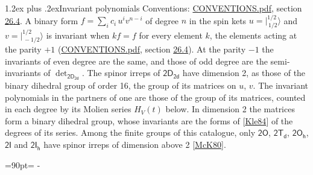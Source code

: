 \documentclass[10pt,a4paper]{article}
\makeatletter
\renewcommand\section{\@startsection{section}{1}{\z@}{-3ex plus -1ex minus -.2ex}%
  {1.2ex plus .2ex}{\normalfont\large\sffamily\bfseries\color{parttitle}}}
\newcommand{\needspace}[1]{\par\penalty-100\begingroup\dimen0=#1\relax\dimen2=\pagegoal
  \advance\dimen2-\pagetotal\ifdim\dimen0>\dimen2\relax\ifdim\dimen2>0pt\vfil\break\fi\fi
  \endgroup}
\numberwithin{equation}{section}
\newcommand{\grp}[1]{\mathsf{#1}}
\newcommand{\jm}[2]{\bigl\lvert{}^{#1}_{\,#2}\bigr\rangle}
\makeatother
\begin{document}
\section{Invariant polynomials}\label{s:invariants}
Conventions: \href{../../CONVENTIONS.pdf}{CONVENTIONS.pdf}, section \href{../../CONVENTIONS.pdf\#conv.26.4}{26.4}.
\leavevmode\label{n:local.binary.form}A binary form $f = \sum_i c_i\, u^i v^{n-i}$ of degree $n$ in the spin kets $u = \jm{1/2}{1/2}$ and $v = \jm{1/2}{-1/2}$ is invariant when $k f = f$ for every element $k$, the elements acting at the parity $+1$ (\href{../../CONVENTIONS.pdf}{CONVENTIONS.pdf}, section \href{../../CONVENTIONS.pdf\#conv.26.4}{26.4}). At the parity $-1$ the invariants of even degree are the same, and those of odd degree are the semi-invariants of $\det_{\grp{2D_{2d}}}$.
The spinor irreps of $\grp{2D_{2d}}$ have dimension 2, as those of the binary dihedral group of order 16, the group of its matrices on $u$, $v$. \label{n:function.hilbert}The invariant polynomials in the partners of one are those of the group of its matrices, counted in each degree by its Molien series $H_V(t)$ below. In dimension 2 the matrices form a binary dihedral group, whose invariants are the forms of [\href{../../../REFERENCES.pdf\#ref.Kle84}{Kle84}] of the degrees of its series. Among the finite groups of this catalogue, only $\grp{2O}$, $\grp{2T_{d}}$, $\grp{2O_{h}}$, $\grp{2I}$ and $\grp{2I_{h}}$ have spinor irreps of dimension above 2 [\href{../../../REFERENCES.pdf\#ref.McK80}{McK80}].
\needspace{90pt}
\end{document}
